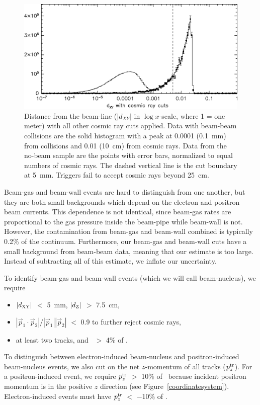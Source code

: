\documentclass{cornell}
\begin{document}
\begin{figure}[p]
  \begin{center}
    \includegraphics[width=\linewidth]{dxydzcontaminationa}
  \end{center}
  \caption[Projecting cosmic ray magnitude into accepted data using
  the no-beam sample]{\label{dxydzcontaminationa} Distance from the
  beam-line ($|d_{XY}|$ in $\log x$-scale, where 1 = one meter) with
  all other cosmic ray cuts applied.  Data with beam-beam collisions
  are the solid histogram with a peak at 0.0001 (0.1~mm) from
  collisions and 0.01 (10~cm) from cosmic rays.  Data from the no-beam
  sample are the points with error bars, normalized to equal numbers
  of cosmic rays.  The dashed vertical line is the cut boundary at
  5~mm.  Triggers fail to accept cosmic rays beyond 25~cm.}
\end{figure}

Beam-gas and beam-wall events are hard to distinguish from one
another, but they are both small backgrounds which depend on the
electron and positron beam currents.  This dependence is not
identical, since beam-gas rates are proportional to the gas pressure
inside the beam-pipe while beam-wall is not.  However, the
contamination from beam-gas and beam-wall combined is typically 0.2\%
of the continuum.  Furthermore, our beam-gas and beam-wall cuts have a
small background from beam-beam data, meaning that our estimate is too
large.  Instead of subtracting all of this estimate, we inflate our
uncertainty.

To identify beam-gas and beam-wall events (which we will call
beam-nucleus), we require
\begin{itemize}

  \item $|d_{\mbox{\scriptsize XY}}|$ $<$ 5~mm, $|d_{\mbox{\scriptsize Z}}|$ $>$ 7.5~cm,

  \item $|\vec{p}_1 \cdot \vec{p}_2| / |\vec{p}_1| |\vec{p}_2|$ $<$
    0.9 to further reject cosmic rays,

  \item at least two tracks, and \visen\ $>$ 4\% of \ecm.

\end{itemize}
To distinguish between electron-induced beam-nucleus and
positron-induced beam-nucleus events, we also cut on the net
$z$-momentum of all tracks ($p_z^{\mbox{\scriptsize tr}}$).  For a positron-induced
event, we require $p_z^{\mbox{\scriptsize tr}}$ $>$ 10\% of \ebeam\ because incident
positron momentum is in the positive $z$ direction (see Figure~\ref{coordinatesystem}).  Electron-induced events must have
$p_z^{\mbox{\scriptsize tr}}$ $<$ $-$10\% of \ebeam.
\end{document}
